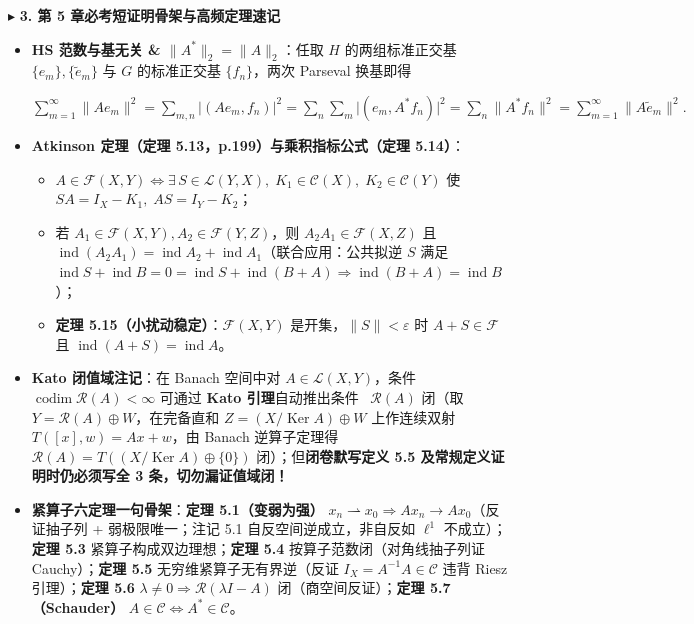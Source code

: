 \documentclass[11pt,a4paper]{article}
\providecommand{\tightlist}{\setlength{\itemsep}{1.8pt}\setlength{\parskip}{0pt}}
\newcommand{\CircNum}[1]{%
  \tikz[baseline=(char.base)]{\node[shape=circle, fill=AccentMain, text=white, inner sep=1pt, font=\tiny\bfseries] (char) {#1};}\,%
}
\newcommand{\SubSubHeading}[1]{%
  \Needspace{6.5\baselineskip}\vspace{5.5pt}\noindent
  \textcolor{AccentMain}{\scriptsize$\blacktriangleright$}\hspace{4pt}%
  {\small\bfseries\color{AccentMain}#1}\par\nopagebreak[4]\vspace{2.5pt}%
}
\newcommand{\FitDisplayMath}[1]{%
  \par\vspace{4pt}\noindent
  \begin{adjustbox}{max width=\linewidth, center}
    $\displaystyle #1$
  \end{adjustbox}
  \par\vspace{4pt}%
}
\begin{document}
\SubSubHeading{3. 第 5 章必考短证明骨架与高频定理速记}

\begin{itemize}
\tightlist
\item
  \textbf{HS 范数与基无关 \& \(\lVert A^*\rVert_2=\lVert A\rVert_2\)}：任取 \(H\) 的两组标准正交基 \(\{e_m\},\{\tilde{e}_m\}\) 与 \(G\) 的标准正交基 \(\{f_n\}\)，两次 Parseval 换基即得 
\FitDisplayMath{\sum_{m=1}^\infty\lVert Ae_m\rVert^2 = \sum_{m,n}\lvert(Ae_m,f_n)\rvert^2 = \sum_n\sum_m\lvert(e_m,A^*f_n)\rvert^2 = \sum_n\lVert A^*f_n\rVert^2 = \sum_{m=1}^\infty\lVert A\tilde{e}_m\rVert^2.}

\item
  \textbf{Atkinson 定理（定理 5.13，p.199）与乘积指标公式（定理 5.14）}：

  \begin{itemize}
  \tightlist
  \item
    \(A\in\mathcal{F}(X,Y)\iff\exists\,S\in\mathcal{L}(Y,X),\;K_1\in\mathcal{C}(X),\;K_2\in\mathcal{C}(Y)\) 使 \(SA=I_X-K_1,\;AS=I_Y-K_2\)；
  \item
    若 \(A_1\in\mathcal{F}(X,Y), A_2\in\mathcal{F}(Y,Z)\)，则 \(A_2A_1\in\mathcal{F}(X,Z)\) 且 \(\operatorname{ind}(A_2A_1)=\operatorname{ind}A_2+\operatorname{ind}A_1\)（联合应用：公共拟逆 \(S\) 满足 \(\operatorname{ind}S+\operatorname{ind}B=0=\operatorname{ind}S+\operatorname{ind}(B+A)\Rightarrow\operatorname{ind}(B+A)=\operatorname{ind}B\)）；
  \item
    \textbf{定理 5.15（小扰动稳定）}：\(\mathcal{F}(X,Y)\) 是开集，\(\lVert S\rVert<\varepsilon\) 时 \(A+S\in\mathcal{F}\) 且 \(\operatorname{ind}(A+S)=\operatorname{ind}A\)。
  \end{itemize}
\item
  \textbf{Kato 闭值域注记}：在 Banach 空间中对 \(A\in\mathcal{L}(X,Y)\)，条件 \CircNum{3} \(\operatorname{codim}\mathcal{R}(A)<\infty\) 可通过 \textbf{Kato 引理}自动推出条件 \CircNum{2} \(\mathcal{R}(A)\) 闭（取 \(Y=\mathcal{R}(A)\oplus W\)，在完备直和 \(Z=(X/\operatorname{Ker}A)\oplus W\) 上作连续双射 \(T([x],w)=Ax+w\)，由 Banach 逆算子定理得 \(\mathcal{R}(A)=T((X/\operatorname{Ker}A)\oplus\{0\})\) 闭）；但\textbf{闭卷默写定义 5.5 及常规定义证明时仍必须写全 3 条，切勿漏证值域闭！}
\item
  \textbf{紧算子六定理一句骨架}：\textbf{定理 5.1（变弱为强）} \(x_n\rightharpoonup x_0\Rightarrow Ax_n\to Ax_0\)（反证抽子列 + 弱极限唯一；注记 5.1 自反空间逆成立，非自反如 \(\ell^1\) 不成立）；\textbf{定理 5.3} 紧算子构成双边理想；\textbf{定理 5.4} 按算子范数闭（对角线抽子列证 Cauchy）；\textbf{定理 5.5} 无穷维紧算子无有界逆（反证 \(I_X=A^{-1}A\in\mathcal{C}\) 违背 Riesz 引理）；\textbf{定理 5.6} \(\lambda\neq 0\Rightarrow\mathcal{R}(\lambda I-A)\) 闭（商空间反证）；\textbf{定理 5.7（Schauder）} \(A\in\mathcal{C}\iff A^*\in\mathcal{C}\)。
\end{itemize}
\end{document}
